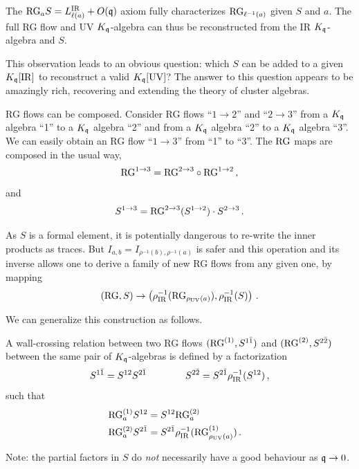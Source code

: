 \documentclass[12pt]{amsart}
\begin{document}
\begin{remark} The $\mathrm{RG}_a S = L^{\mathrm{IR}}_{\ell(a)} + O(\mathfrak{q})$ axiom fully characterizes $\mathrm{RG}_{\ell^{-1}(a)}$ given $S$ and $a$.  The full RG flow and UV $K_{\mathfrak{q}}$-algebra can thus be reconstructed from the IR $K_{\mathfrak{q}}$-algebra and $S$. \end{remark} 
This observation leads to an obvious question: which $S$ can be added to a given $K_{\mathfrak{q}}[\mathrm{IR}]$ to reconstruct a valid $K_{\mathfrak{q}}[\mathrm{UV}]$? The answer to this question appears to be amazingly rich, recovering and extending the theory of cluster algebras. 

\begin{remark} RG flows can be composed. Consider RG flows ``$1 \to 2$'' and ``$2 \to 3$'' from a $K_{\mathfrak{q}}$ algebra ``1'' to a $K_{\mathfrak{q}}$ algebra ``2'' and from a $K_{\mathfrak{q}}$ algebra ``2'' to a $K_{\mathfrak{q}}$ algebra ``3''.
We can easily obtain an RG flow ``$1 \to 3$'' from ``1'' to ``3''. The $\mathrm{RG}$ maps are composed in the usual way, 
\begin{equation}
	\mathrm{RG}^{1 \to 3} = \mathrm{RG}^{2\to 3} \circ \mathrm{RG}^{1 \to 2} \, ,
\end{equation}
and 
\begin{equation}
	S^{1 \to 3} = \mathrm{RG}^{2\to 3}(S^{1 \to 2}) \cdot S^{2 \to 3} \, .
\end{equation}
\end{remark}

\begin{remark} As $S$ is a formal element, it is potentially dangerous to re-write the inner products as traces. But $I_{a,b} = I_{\rho^{-1}(b),\rho^{-1}(a)}$ is safer and this operation and its inverse allows one to derive a family of new RG flows from any given one, by mapping  
\begin{align}
	(\mathrm{RG},S) \to \left( \rho^{-1}_{\mathrm{IR}}(\mathrm{RG}_{\rho_{\mathrm{UV}}(a)}), \rho^{-1}_{\mathrm{IR}}(S) \right) \, .
\end{align}
\end{remark}
We can generalize this construction as follows. 

\begin{definition}
\label{def:wallcrossing}
A wall-crossing relation between two RG flows $(\mathrm{RG}^{(1)},S^{1 \bar 1})$ and $(\mathrm{RG}^{(2)},S^{2 \bar 2})$ between the same pair of $K_{\mathfrak{q}}$-algebras is defined by a factorization  
\begin{equation}
	S^{1 \bar 1} = S^{12} S^{2 \bar 1} \qquad \qquad S^{2 \bar 2} = S^{2 \bar 1} \rho^{-1}_{\mathrm{IR}}(S^{12}) \,,
\end{equation}
such that
\begin{align}
	\mathrm{RG}^{(1)}_a S^{12} &= S^{12} \mathrm{RG}^{(2)}_a\cr
	\mathrm{RG}^{(2)}_a S^{2 \bar 1} &= S^{2 \bar 1}  \rho^{-1}_{\mathrm{IR}}(\mathrm{RG}^{(1)}_{\rho_{\mathrm{UV}}(a)}) \,.
\end{align}
\end{definition}
Note: the partial factors in $S$ do {\it not} necessarily have a good behaviour as $\mathfrak{q} \to 0$. 
\end{document}
